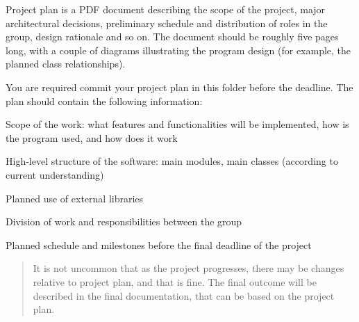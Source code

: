 Project plan is a PDF document describing the scope of the project, major architectural decisions, preliminary schedule and distribution of roles in the group, design rationale and so on. The document should be roughly five pages long, with a couple of diagrams illustrating the program design (for example, the planned class relationships).

You are required commit your project plan in this folder before the deadline. The plan should contain the following information\+:


\begin{DoxyItemize}
\item Scope of the work\+: what features and functionalities will be implemented, how is the program used, and how does it work
\item High-\/level structure of the software\+: main modules, main classes (according to current understanding)
\item Planned use of external libraries
\item Division of work and responsibilities between the group
\item Planned schedule and milestones before the final deadline of the project
\end{DoxyItemize}

\begin{quote}
It is not uncommon that as the project progresses, there may be changes relative to project plan, and that is fine. The final outcome will be described in the final documentation, that can be based on the project plan. \end{quote}
